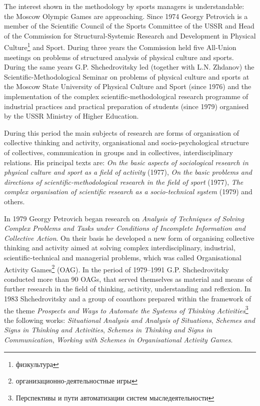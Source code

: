 \documentclass[a4paper,11pt]{article}
\begin{document}
The interest shown in the methodology by sports managers is understandable:
the Moscow Olympic Games are approaching. Since 1974 Georgy Petrovich is a
member of the Scientific Council of the Sports Committee of the USSR and Head
of the Commission for Structural-Systemic Research and Development in Physical
Culture\footnote{\foreignlanguage{russian}{физкультура}} and Sport. During
three years the Commission held five All-Union meetings on problems of
structured analysis of physical culture and sports. During the same years
G.P. Shchedrovitsky led (together with L.N. Zhdanov) the
Scientific-Methodological Seminar on problems of physical culture and sports
at the Moscow State University of Physical Culture and Sport (since 1976) and
the implementation of the complex scientific-methodological research programme
of industrial practices and practical preparation of students (since 1979)
organised by the USSR Ministry of Higher Education.

During this period the main subjects of research are forms of organisation of
collective thinking and activity, organisational and socio-psychological
structure of collectives, communication in groups and in collectives,
interdisciplinary relations. His principal texts are: \emph{On the basic
  aspects of sociological research in physical culture and sport as a field of
  activity} (1977), \emph{On the basic problems and directions of
  scientific-methodological research in the field of sport} (1977), \emph{The
  complex organisation of scientific research as a socio-technical system}
(1979) and others.

In 1979 Georgy Petrovich began research on \emph{Analysis of Techniques of
  Solving Complex Problems and Tasks under Conditions of Incomplete
  Information and Collective Action}. On their basis he developed a new form
of organising collective thinking and activity aimed at solving complex
interdisciplinary, industrial, scientific-technical and managerial problems,
which was called Organisational Activity
Games\footnote{\foreignlanguage{russian}{организационно-деятельностные игры}}
(OAG). In the period of 1979--1991 G.P. Shchedrovitsky conducted more than 90
OAGs, that served themselves as material and means of further research in the
field of thinking, activity, understanding and reflexion. In 1983
Shchedrovitsky and a group of coauthors prepared within the framework of the
theme \emph{Prospects and Ways to Automate the Systems of Thinking
  Activities}\footnote{\foreignlanguage{russian}{Перспективы и пути
    автоматизации систем мыследеятельности}} the following works:
\emph{Situational Analysis and Analysis of Situations}, \emph{Schemes and
  Signs in Thinking and Activities}, \emph{Schemes in Thinking and Signs in
  Communication}, \emph{Working with Schemes in Organisational Activity Games}.
\end{document}
